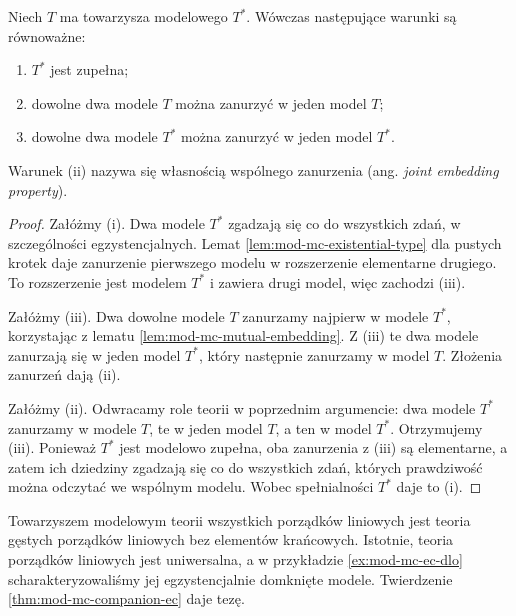 \begin{wniosek}
\label{cor:mod-mc-companion-complete}
Niech $T$ ma towarzysza modelowego $T^*$. Wówczas
następujące warunki są równoważne:
\begin{enumerate}[label=(\roman*)]
\item $T^*$ jest zupełna;
\item dowolne dwa modele $T$ można zanurzyć w jeden
model $T$;
\item dowolne dwa modele $T^*$ można zanurzyć w jeden
model $T^*$.
\end{enumerate}
Warunek (ii) nazywa się własnością wspólnego zanurzenia
(ang. \emph{joint embedding property}).
\end{wniosek}
\begin{proof}
Załóżmy (i). Dwa modele $T^*$ zgadzają się co do
wszystkich zdań, w szczególności egzystencjalnych.
Lemat \ref{lem:mod-mc-existential-type} dla pustych
krotek daje zanurzenie pierwszego modelu w rozszerzenie
elementarne drugiego. To rozszerzenie jest modelem
$T^*$ i zawiera drugi model, więc zachodzi (iii).

Załóżmy (iii). Dwa dowolne modele $T$ zanurzamy
najpierw w modele $T^*$, korzystając z lematu
\ref{lem:mod-mc-mutual-embedding}. Z (iii) te dwa
modele zanurzają się w jeden model $T^*$, który
następnie zanurzamy w model $T$. Złożenia zanurzeń
dają (ii).

Załóżmy (ii). Odwracamy role teorii w poprzednim
argumencie: dwa modele $T^*$ zanurzamy w modele $T$,
te w jeden model $T$, a ten w model $T^*$.
Otrzymujemy (iii). Ponieważ $T^*$ jest modelowo
zupełna, oba zanurzenia z (iii) są elementarne,
a zatem ich dziedziny zgadzają się co do wszystkich
zdań, których prawdziwość można odczytać we wspólnym
modelu. Wobec spełnialności $T^*$ daje to (i).
\end{proof}

\begin{przyklad}
\label{ex:mod-mc-companion-dlo}
Towarzyszem modelowym teorii wszystkich porządków
liniowych jest teoria gęstych porządków liniowych
bez elementów krańcowych. Istotnie, teoria porządków
liniowych jest uniwersalna, a w przykładzie
\ref{ex:mod-mc-ec-dlo} scharakteryzowaliśmy jej
egzystencjalnie domknięte modele. Twierdzenie
\ref{thm:mod-mc-companion-ec} daje tezę.
\end{przyklad}

